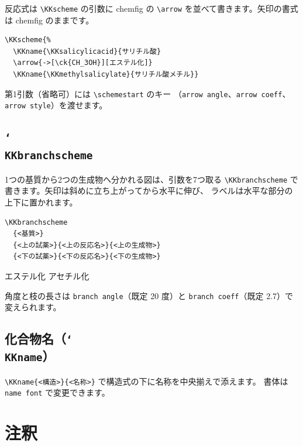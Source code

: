 \documentclass[paper=a4paper,fontsize=10pt]{jlreq}
\begin{document}
反応式は \verb|\KKscheme| の引数に \textsf{chemfig} の
\verb|\arrow| を並べて書きます。矢印の書式は \textsf{chemfig} のままです。

\begin{verbatim}
\KKscheme{%
  \KKname{\KKsalicylicacid}{サリチル酸}
  \arrow{->[\ck{CH_3OH}][エステル化]}
  \KKname{\KKmethylsalicylate}{サリチル酸メチル}}
\end{verbatim}


第1引数（省略可）には \verb|\schemestart| のキー
（\verb|arrow angle|、\verb|arrow coeff|、\verb|arrow style|）を渡せます。

\subsection{\texttt{\char`\\KKbranchscheme}}

1つの基質から2つの生成物へ分かれる図は、引数を7つ取る
\verb|\KKbranchscheme| で書きます。矢印は斜めに立ち上がってから水平に伸び、
ラベルは水平な部分の上下に置かれます。

\begin{verbatim}
\KKbranchscheme
  {<基質>}
  {<上の試薬>}{<上の反応名>}{<上の生成物>}
  {<下の試薬>}{<下の反応名>}{<下の生成物>}
\end{verbatim}

\KKbranchscheme
  {}
  {}{エステル化}{}
  {}{アセチル化}{}

角度と枝の長さは \verb|branch angle|（既定 20 度）と
\verb|branch coeff|（既定 2.7）で変えられます。

\subsection{化合物名（\texttt{\char`\\KKname}）}

\verb|\KKname{<構造>}{<名称>}| で構造式の下に名称を中央揃えで添えます。
書体は \verb|name font| で変更できます。

\section{注釈}
\end{document}

